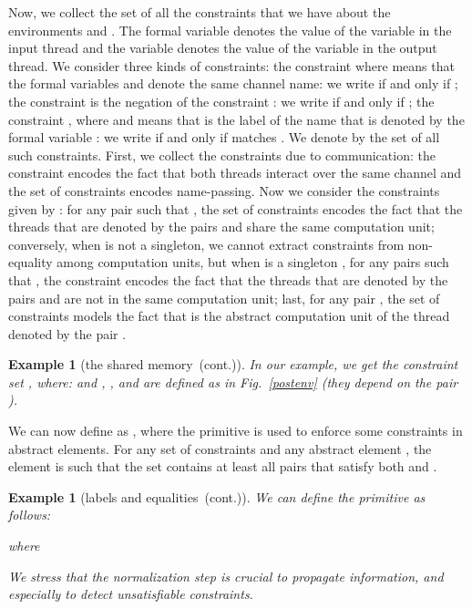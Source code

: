 \documentclass{article}
\newcommand{\boxexample}{}
\newtheorem{example}[thm]{Example}
\newcommand{\continued}{(cont.)}
\newcommand{\cfadomain}{labels and equalities}
\newcommand{\ccfadomain}{\cfadomain\ \continued}
\newcommand{\shareanalysis}{the shared memory}
\newcommand{\cflowanalysis}{\shareanalysis\ \continued}
\begin{document}
Now, we collect the set  of all the constraints that we have about the environments  and .
The formal variable   denotes the value  of the variable  in the input thread and the variable  denotes the value  of the variable  in the output thread.
We consider three kinds of constraints:
the constraint   where  means that the formal variables  and  denote the same channel name: we write  if and only if ;
the constraint   is the negation of the constraint : we write  if and only if ;
the constraint , where  and  means that  is the label of the name that is denoted by the formal variable : 
we write  if and only if 
 matches .
We denote by  the set of all such constraints.
First, we collect the constraints due to communication: 
the constraint  encodes the fact that both threads interact over the same channel and 
the set  of constraints encodes name-passing. 
Now we consider the constraints given by :
for any pair  such that ,  
the set of constraints   encodes the fact that the threads that are denoted by the pairs  and  share the same computation unit; 
conversely, when  is not a singleton, we cannot extract constraints from non-equality among computation units, but  
when  is a singleton , for any pairs  such that , the constraint  encodes the fact that the threads that are denoted by the pairs  and  are not in the same computation unit; 
last, for any pair , the set of constraints  models the fact that  
is the abstract computation unit of the thread denoted by the pair .

\begin{example}[\cflowanalysis]
In our example, we get the constraint set , where:
 and , , and  are defined as in Fig.~\ref{postenv} (they depend on the pair ).
\boxexample\end{example}





We can now define  as , where the primitive  is used to enforce some constraints in abstract elements. For any set  of constraints and any abstract element , the element  
is such that the set   contains at least all pairs  that satisfy both   and  . 

\begin{example}[\ccfadomain]
We can define the primitive  as follows:

where



\noindent We stress that the normalization step is crucial to propagate information, and especially to detect unsatisfiable constraints.
\boxexample\end{example}
\end{document}
